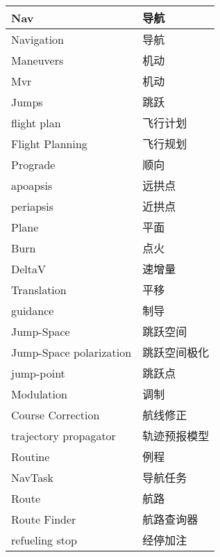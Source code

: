 \documentclass[a4paper]{article}
\theoremstyle{definition}
\begin{document}
{\small{
\begin{longtable}{|p{4.5cm}|p{\textwidth-6.5cm}|}
	\hline
	Nav                             & 导航      \\ \hline
	Navigation                      & 导航      \\ \hline
	Maneuvers                       & 机动      \\ \hline
	Mvr                             & 机动      \\ \hline
	Jumps                           & 跳跃      \\ \hline
	flight plan                     & 飞行计划    \\ \hline
	Flight Planning                 & 飞行规划    \\ \hline
	Prograde                        & 顺向      \\ \hline
	apoapsis                        & 远拱点     \\ \hline
	periapsis                       & 近拱点     \\ \hline
	Plane                           & 平面      \\ \hline
	Burn                            & 点火      \\ \hline
	DeltaV                          & 速增量     \\ \hline
	Translation                     & 平移      \\ \hline
	guidance                        & 制导      \\ \hline
	Jump-Space                      & 跳跃空间    \\ \hline
	Jump-Space polarization         & 跳跃空间极化  \\ \hline
	jump-point                      & 跳跃点     \\ \hline
	Modulation                      & 调制      \\ \hline
	Course Correction               & 航线修正    \\ \hline
	trajectory propagator           & 轨迹预报模型  \\ \hline
	Routine                         & 例程      \\ \hline
	NavTask                         & 导航任务    \\ \hline
	Route                           & 航路      \\ \hline
	Route Finder                    & 航路查询器   \\ \hline
	refueling stop                  & 经停加注    \\ \hline

\end{longtable}}}
\end{document}
